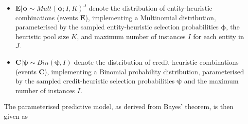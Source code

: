 \begin{itemize}
      \item $\boldsymbol{E} \vert \boldsymbol{\phi} \sim Mult(\boldsymbol{\phi}; I, K)^{J}$ denote the distribution of entity-heuristic combinations (events $\boldsymbol{E}$), implementing a Multinomial distribution, parameterised by the sampled entity-heuristic selection probabilities $\boldsymbol{\phi}$, the heuristic pool size $K$, and maximum number of instances $I$ for each entity in $J$.

      \item $\boldsymbol{C} \vert \boldsymbol{\psi} \sim Bin(\boldsymbol{\psi}, I)$ denote the distribution of credit-heuristic combinations (events $\boldsymbol{C}$), implementing a Binomial probability distribution, parameterised by the sampled credit-heuristic selection probabilities $\boldsymbol{\psi}$ and the maximum number of instances $I$.
\end{itemize}

The parameterised predictive model, as derived from Bayes' theorem, is then given as

